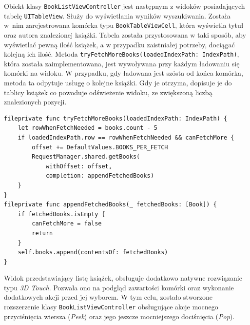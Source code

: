 \documentclass[twoside]{projektInzynierskiMS}
\begin{document}
Obiekt klasy \verb`BookListViewController` jest następnym z widoków posiadających tabelę \verb`UITableView`. Służy do wyświetlania wyników wyszukiwania. Została w~nim zarejestrowana komórka typu \verb`BookTableViewCell`, która wyświetla tytuł oraz autora znalezionej książki. Tabela została przystosowana w taki sposób, aby wyświetlać pewną ilość książek, a w przypadku zaistniałej potrzeby, dociągać kolejną ich ilość. Metoda \verb`tryFetchMoreBooks(loadedIndexPath: IndexPath)`, która została zaimplementowana, jest wywoływana przy każdym ładowaniu się komórki na widoku. W przypadku, gdy ładowana jest szósta od końca komórka, metoda ta odpytuje usługę o kolejne książki. Gdy je otrzyma, dopisuje je do tablicy książek co powoduje odświeżenie widoku, ze zwiększoną liczbą znalezionych pozycji.

\begin{verbatim}
fileprivate func tryFetchMoreBooks(loadedIndexPath: IndexPath) {
    let rowWhenFetchNeeded = books.count - 5
    if loadedIndexPath.row == rowWhenFetchNeeded && canFetchMore {
        offset += DefaultValues.BOOKS_PER_FETCH
        RequestManager.shared.getBooks(
            withOffset: offset,
            completion: appendFetchedBooks)
    }
}
fileprivate func appendFetchedBooks(_ fetchedBooks: [Book]) {
    if fetchedBooks.isEmpty {
        canFetchMore = false
        return
    }
    self.books.append(contentsOf: fetchedBooks)
}
\end{verbatim}

Widok przedstawiający listę książek, obsługuje dodatkowo natywne rozwiązanie typu \textit{3D Touch}. Pozwala ono na podgląd zawartości komórki oraz wykonanie dodatkowych akcji przed jej wyborem. W tym celu, zostało stworzone rozszerzenie klasy \verb`BookListViewController` obsługujące akcje mocnego przyciśnięcia wiersza (\textit{Peek}) oraz jego jeszcze mocniejszego dociśnięcia (\textit{Pop}).
\end{document}
